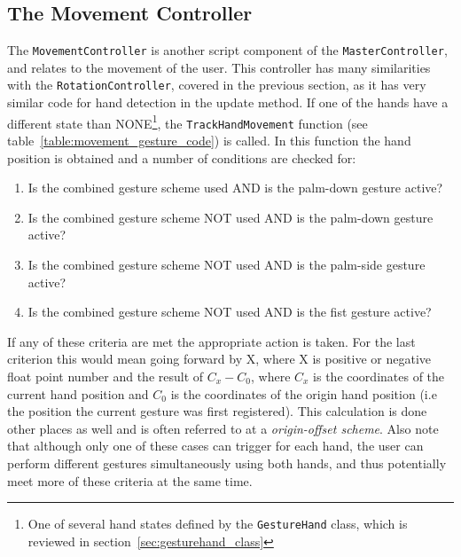
\subsection{The Movement Controller}
The \texttt{MovementController} is another script component of the \texttt{MasterController}, and relates to the movement of the user. 
This controller has many similarities with the \texttt{RotationController}, covered in the previous section, as it has very similar
code for hand detection in the update method. If one of the hands have a different state than NONE\footnote{One of several hand states defined by the \texttt{GestureHand} class, 
which is reviewed in section~\vref{sec:gesturehand_class}}, the \texttt{TrackHandMovement} function
(see table~\vref{table:movement_gesture_code}) is called. In this function the hand position is obtained and a number of conditions are checked for:

\begin{enumerate}
    \item Is the combined gesture scheme used AND is the palm-down gesture active?
    \item Is the combined gesture scheme NOT used AND is the palm-down gesture active?
    \item Is the combined gesture scheme NOT used AND is the palm-side gesture active?
    \item Is the combined gesture scheme NOT used AND is the fist gesture active?
\end{enumerate}

If any of these criteria are met the appropriate action is taken. 
For the last criterion this would mean going forward by X, where X is positive or negative float point number 
and the result of $C_x - C_0$, where $C_x$ is the coordinates of the current hand position and $C_0$ is the coordinates of the origin hand position 
(i.e the position the current gesture was first registered). 
This calculation is done other places as well and is often referred to at a \textit{origin-offset scheme}.
Also note that although only one of these cases can trigger for each hand, the user can 
perform different gestures simultaneously using both hands, and thus potentially meet more of these criteria at the same time.

